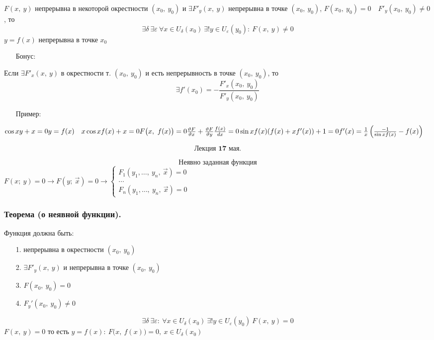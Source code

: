 \documentclass[12pt, letterpaper, twoside]{article}
\begin{document}
    $F(x,\ y)$ непрерывна в некоторой окрестности $(x_0,\ y_0)$ и $\exists F'_y(x,\ y)$ непрерывна в точке $(x_0,\ y_0)$, $F(x_0,\ y_0) = 0\quad F'_y(x_0,\ y_0) \neq 0$, то
    \[\exists \delta\ \exists \varepsilon\ \forall x\in U_{\delta}(x_0)\ \exists! y\in U_{\varepsilon}(y_0):\ F(x,\ y) \neq 0\]
    $y = f(x)$ непрерывна в точке $x_0$
    \begin{enumerate}
        \item[Бонус:]
    \end{enumerate}
    Если $\exists F'_x(x,\ y)$ в окрестности т. $(x_0,\ y_0)$ и есть непрерывность в точке $(x_0,\ y_0)$, то
    \[\exists f'(x_0) = -\dfrac{F'_x(x_0,\ y_0)}{F'_y (x_0,\ y_0)}\]
    \begin{enumerate}
        \item[Пример:]
    \end{enumerate}
    $\cos xy + x = 0\\
    y = f(x)\quad x\cos x f(x) + x = 0\\
    F\big(x,\ f(x)\big) = 0\\
    \frac{\vartheta F}{\vartheta x} + \frac{\vartheta F}{\vartheta y}\frac{f(x)}{dx} = 0\\
    \sin x f(x) (f(x) + xf'(x)) + 1 = 0\\
    f'(x) = \frac{1}{x}\left(\frac{-1}{\sin x f(x)} - f(x)\right)$
    
\newpage\[\textbf{Лекция 17 мая.}\]

    \[\text{Неявно заданная функция}\]
    $F(x;\ y) = 0\longrightarrow F(y;\ \vec{x}) = 0\longrightarrow \begin{cases}
        F_1(y_1,\dots,\ y_n,\ \vec{x}) = 0\\
        \dots\\
        F_n(y_1,\dots,\ y_n,\ \vec{x}) = 0
    \end{cases}$
    \subsubsection*{Теорема (о неявной функции).}
    Функция должна быть:
    \begin{enumerate}
        \item[1.] непрерывна в окрестности $(x_0,\ y_0)$
        \item[2.] $\exists F'_y(x,\ y)$ и непрерывна в точке $(x_0,\ y_0)$
        \item[3.] $F(x_0,\ y_0) = 0$
        \item[4.] $F_y'(x_0,\ y_0) \neq 0 $   
    \end{enumerate}
    \[\exists \delta\ \exists \varepsilon:\ \forall x\in U_{\delta}(x_0)\ \exists!y\in U_{\varepsilon}(y_0)\ F(x,\ y) = 0\]
    $F(x,\ y) = 0$ то есть $y = f(x):\ F\big(x,\ f(x)\big) = 0,\ x\in U_{\delta}(x_0)$
\end{document}
